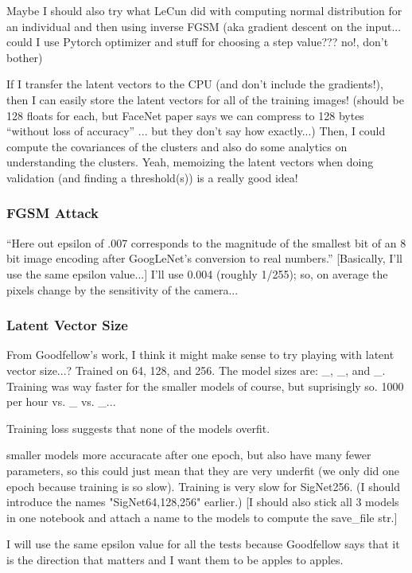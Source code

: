 Maybe I should also try what LeCun did with computing normal distribution for an individual and then using inverse FGSM (aka gradient descent on the input... could I use Pytorch optimizer and stuff for choosing a step value??? no!, don't bother)

If I transfer the latent vectors to the CPU (and don't include the gradients!), then I can easily store the latent vectors for all of the training images!
(should be 128 floats for each, but FaceNet paper says we can compress to 128 bytes ``without loss of accuracy'' ... but they don't say how exactly...)
Then, I could compute the covariances of the clusters and also do some analytics on understanding the clusters.
Yeah, memoizing the latent vectors when doing validation (and finding a threshold(s)) is a really good idea!

\subsubsection{FGSM Attack}
``Here out epsilon of .007 corresponds to the magnitude of the
smallest bit of an 8 bit image encoding after GoogLeNet's conversion to real numbers.''\cite{goodfellow}
[Basically, I'll use the same epsilon value...]
I'll use 0.004 (roughly 1/255); so, on average the pixels change by the sensitivity of the camera...

\subsubsection{Latent Vector Size}
From Goodfellow's work, I think it might make sense to try playing with latent vector size...?
Trained on 64, 128, and 256.
The model sizes are: \_, \_, and \_.
Training was way faster for the smaller models of course, but suprisingly so.
1000 per hour vs. \_ vs. \_...

Training loss suggests that none of the models overfit.

smaller models more accuracate after one epoch, but also have many fewer parameters, so this could just mean that they are very underfit (we only did one epoch because training is so slow).
Training is very slow for SigNet256.
(I should introduce the names "SigNet64,128,256" earlier.)
[I should also stick all 3 models in one notebook and attach a name to the models to compute the save\_file str.]

I will use the same epsilon value for all the tests because Goodfellow says that it is the direction that matters and I want them to be apples to apples.

